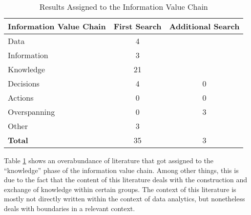 \begin{table}[htbp]
    \centering
    \begin{tabular}{lcc}
    \hline
    \multicolumn{1}{c}{Information Value Chain}  & First Search & \multicolumn{1}{l}{Additional Search} \\ \hline
    Data                                         & 4            &                                       \\
    Information                                  & 3            &                                       \\
    Knowledge                                    & 21           &                                       \\
    Decisions                                    & 4            & 0                                      \\
    Actions                                      & 0            & 0                                      \\
    Overspanning                                 & 0            & 3                                     \\
    Other                                        & 3            &                                       \\ \hline
    \textbf{Total}                               & 35           & 3                                     \\ \hline
    \end{tabular}
    \caption{Results Assigned to the Information Value Chain}
    \label{informationValueChainResults}
    \end{table}

Table \ref{informationValueChainResults} shows an overabundance of literature that got assigned to the \enquote{knowledge} phase of the information value chain. Among other things, this is due to the fact that the content of this literature deals with the construction and exchange of knowledge within certain groups. The context of this literature is mostly not directly written within the context of data analytics, but nonetheless deals with boundaries in a relevant context. %

